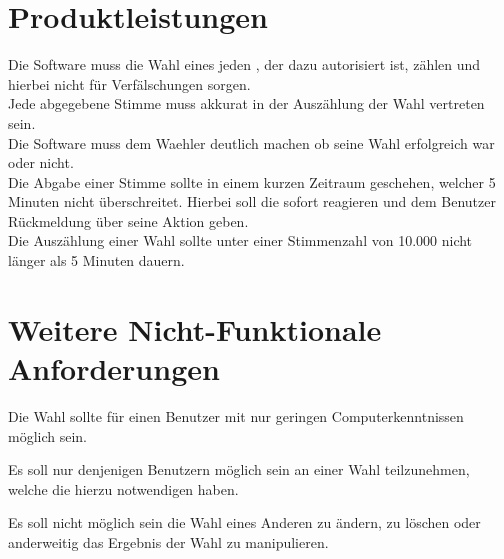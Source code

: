 \documentclass[parskip=full,11pt,twoside]{scrartcl}
\begin{document}
\section{Produktleistungen}
Die Software muss die \gls{Wahl} eines jeden , der dazu autorisiert ist, zählen und hierbei nicht für Verfälschungen sorgen. \\
Jede abgegebene \gls{Stimme} muss akkurat in der Auszählung der \gls{Wahl} vertreten sein. \\
Die Software muss dem \gls{Waehler} deutlich machen ob seine \gls{Wahl} erfolgreich war oder nicht. \\
Die Abgabe einer \gls{Stimme} sollte in einem kurzen Zeitraum geschehen, welcher 5 Minuten nicht überschreitet.
Hierbei soll die  sofort reagieren und dem \gls{Benutzer} Rückmeldung über seine Aktion geben. \\
Die Auszählung einer \gls{Wahl} sollte unter einer Stimmenzahl von 10.000  nicht länger als 5 Minuten dauern.

\section{Weitere Nicht-Funktionale Anforderungen}

Die \gls{Wahl} sollte für einen \gls{Benutzer} mit nur geringen Computerkenntnissen möglich sein.

Es soll nur denjenigen Benutzern möglich sein an einer \gls{Wahl} teilzunehmen, welche die hierzu notwendigen  haben.

Es soll nicht möglich sein die \gls{Wahl} eines Anderen zu ändern,  zu löschen oder anderweitig das Ergebnis der \gls{Wahl} zu manipulieren.
\end{document}
